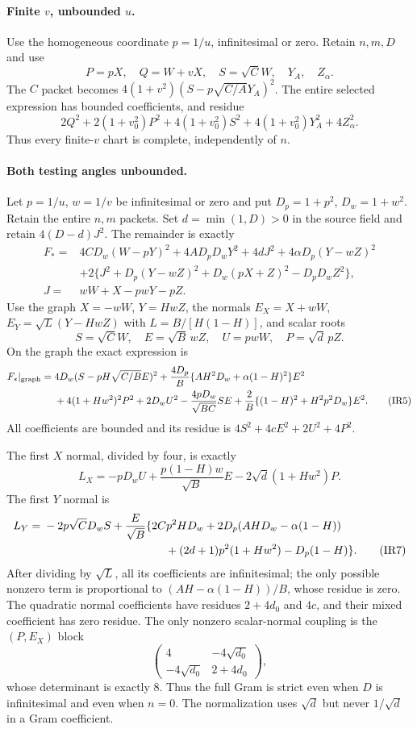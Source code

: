 \paragraph{Finite $v$, unbounded $u$.}
Use the homogeneous coordinate $p=1/u$, infinitesimal or zero.
Retain $n,m,D$ and use
\[
 P=pX,\quad Q=W+vX,\quad S=\sqrt C W,\quad Y_A,\quad Z_\alpha.
\]
The $C$ packet becomes
$4(1+v^2)(S-p\sqrt{C/A}Y_A)^2$.
The entire selected expression has bounded coefficients, and residue
\[
 2Q^2+2(1+v_0^2)P^2+4(1+v_0^2)S^2
       +4(1+v_0^2)Y_A^2+4Z_\alpha^2.
\tag{IR3}
\]
Thus every finite-$v$ chart is complete, independently of $n$.

\paragraph{Both testing angles unbounded.}
Let $p=1/u$, $w=1/v$ be infinitesimal or zero and put
$D_p=1+p^2$, $D_w=1+w^2$.
Retain the entire $n,m$ packets. Set $d=\min(1,D)>0$ in the source
field and retain $4(D-d)J^2$. The remainder is exactly
\begin{align*}
 F_*={}&4CD_w(W-pY)^2+4AD_pD_wY^2+4dJ^2
       +4\alpha D_p(Y-wZ)^2\\
 &+2\{J^2+D_p(Y-wZ)^2+D_w(pX+Z)^2-D_pD_wZ^2\},\\
 J={}&wW+X-pwY-pZ.
\end{align*}
Use the graph $X=-wW$, $Y=HwZ$, the normals
$E_X=X+wW$, $E_Y=\sqrt L(Y-HwZ)$ with
$L=B/[H(1-H)]$, and scalar roots
\[
 S=\sqrt C W,\quad E=\sqrt B\,wZ,\quad
 U=pwW,\quad P=\sqrt d\,pZ.
\tag{IR4}
\]
On the graph the exact expression is
\begin{align*}
 F_*|_{\rm graph}={}&4D_w(S-pH\sqrt{C/B}E)^2
 +\frac{4D_p}{B}\{AH^2D_w+\alpha(1-H)^2\}E^2\\
 &+4(1+Hw^2)^2P^2+2D_wU^2
 -\frac{4pD_w}{\sqrt{BC}}SE
 +\frac2B\{(1-H)^2+H^2p^2D_w\}E^2.
\tag{IR5}
\end{align*}
All coefficients are bounded and its residue is
$4S^2+4cE^2+2U^2+4P^2$.

The first $X$ normal, divided by four, is exactly
\[
 L_X=-pD_wU+\frac{p(1-H)w}{\sqrt B}E
               -2\sqrt d(1+Hw^2)P.
\tag{IR6}
\]
The first $Y$ normal is
\begin{align*}
 L_Y={}&-2p\sqrt C D_w S+\frac{E}{\sqrt B}
 \{2Cp^2HD_w+2D_p(AHD_w-\alpha(1-H))\\
 &\hspace{38mm}+(2d+1)p^2(1+Hw^2)-D_p(1-H)\}.
\tag{IR7}
\end{align*}
After dividing by $\sqrt L$, all its coefficients are infinitesimal;
the only possible nonzero term is proportional to
$(AH-\alpha(1-H))/B$, whose residue is zero.
The quadratic normal coefficients have residues
$2+4d_0$ and $4c$, and their mixed coefficient has zero residue.
The only nonzero scalar-normal coupling is the $(P,E_X)$ block
\[
 \begin{pmatrix}4&-4\sqrt{d_0}\\-4\sqrt{d_0}&2+4d_0\end{pmatrix},
\tag{IR8}
\]
whose determinant is exactly $8$. Thus the full Gram is strict even
when $D$ is infinitesimal and even when $n=0$. The normalization uses
$\sqrt d$ but never $1/\sqrt d$ in a Gram coefficient.

